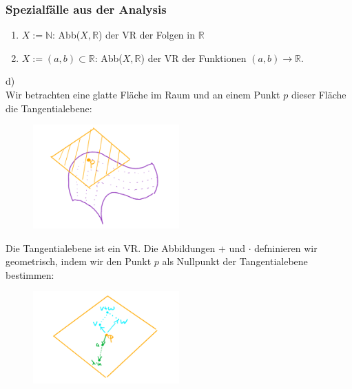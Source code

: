 \documentclass{article}
\begin{document}
\subsubsection*{Spezialfälle aus der Analysis}
\begin{enumerate}
    \item $X:= \mathbb{N}$: Abb($X, \mathbb{R}$) der VR der Folgen in $\mathbb{R}$
    \item $X:= (a,b) \subset \mathbb{R}$: Abb($X, \mathbb{R}$) der VR der Funktionen $(a,b) \rightarrow \mathbb{R}$.
\end{enumerate}

d) \\
Wir betrachten eine glatte Fläche im Raum und an einem Punkt $p$ dieser Fläche die Tangentialebene: \\

\begin{figure}[h]
    \centering
    \includegraphics[width=0.5\textwidth]{Images/4.2d.jpeg}

\end{figure}
Die Tangentialebene ist ein VR. Die Abbildungen + und $\cdot$ defninieren wir geometrisch, indem wir den Punkt $p$ als Nullpunkt der Tangentialebene bestimmen: \\

\begin{figure}[h]
    \centering
    \includegraphics[width=0.5\textwidth]{Images/4.2d2.jpeg}

\end{figure}
\end{document}
